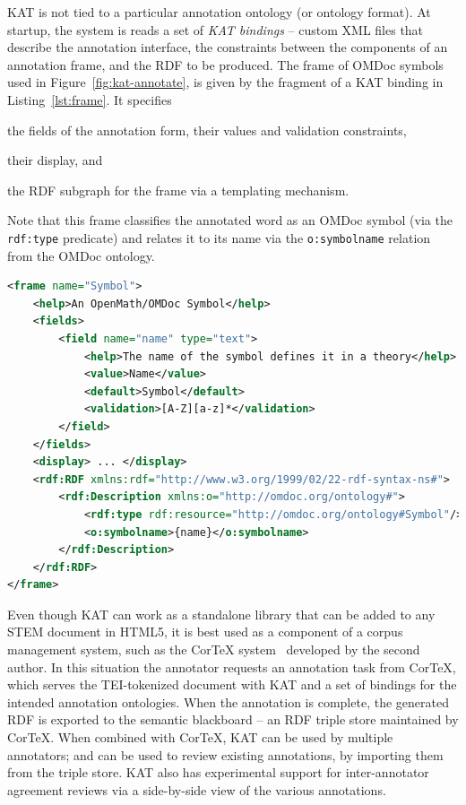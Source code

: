 KAT is not tied to a particular annotation ontology (or ontology format). At startup, the system is reads a set of \textit{KAT bindings} -- custom XML files that describe the annotation interface, the constraints between the components of an annotation frame, and the RDF to be produced. The frame of OMDoc symbols used in Figure~\ref{fig:kat-annotate}, is given by the fragment of a KAT binding in Listing~\ref{lst:frame}. It specifies
\begin{inparaenum}[\em i\rm)]
\item the fields of the annotation form, their values and validation constraints,
\item their display, and
\item the RDF subgraph for the frame via a templating mechanism.
\end{inparaenum}
Note that this frame classifies the annotated word as an OMDoc symbol (via the \lstinline [basicstyle=\sf\normalsize]|rdf:type| predicate) and relates it to its name via the \lstinline[basicstyle=\sf\normalsize]|o:symbolname| relation from the OMDoc ontology.

\begin{lstlisting}[language=XML,label=lst:frame,
caption=A KAT Frame Specification for OMDoc Symbols]
<frame name="Symbol">
    <help>An OpenMath/OMDoc Symbol</help>
    <fields>
        <field name="name" type="text">
            <help>The name of the symbol defines it in a theory</help>
            <value>Name</value>
            <default>Symbol</default>
            <validation>[A-Z][a-z]*</validation>
        </field>
    </fields>
    <display> ... </display>
    <rdf:RDF xmlns:rdf="http://www.w3.org/1999/02/22-rdf-syntax-ns#">
        <rdf:Description xmlns:o="http://omdoc.org/ontology#">
            <rdf:type rdf:resource="http://omdoc.org/ontology#Symbol"/>
            <o:symbolname>{name}</o:symbolname>
        </rdf:Description>
    </rdf:RDF>
</frame>
\end{lstlisting}

Even though KAT can work as a standalone library that can be added to any STEM document
in HTML5, it is best used as a component of a corpus management system, such as the {Cor\TeX}
system~\cite{CorTeX:on} developed by the second author. In this situation the annotator
requests an annotation task from {Cor\TeX}, which serves the TEI-tokenized document with
KAT and a set of bindings for the intended annotation ontologies. When the annotation is
complete, the generated RDF is exported to the semantic blackboard -- an RDF triple store
maintained by {Cor\TeX}. When combined with {Cor\TeX}, KAT can be used by multiple
annotators; and can be used to review existing annotations, by importing them from the
triple store.  KAT also has experimental support for inter-annotator agreement reviews
via a side-by-side view of the various annotations.

